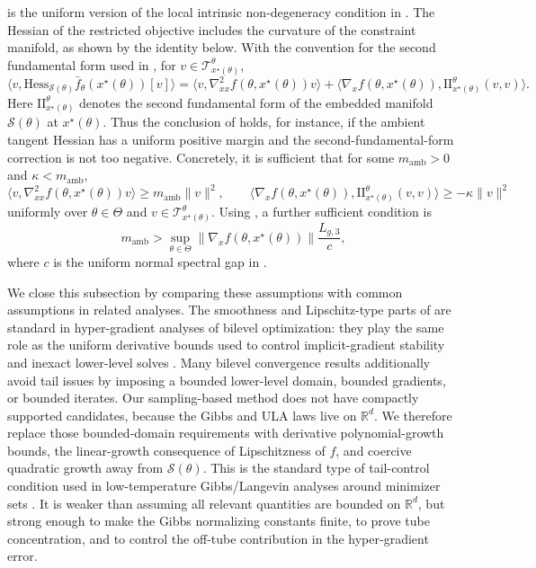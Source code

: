 \documentclass{article}
\theoremstyle{normaltheorem}
\newcommand{\R}{\mathbb{R}}
\newcommand{\calS}{\mathcal{S}}
\newcommand{\calT}{\mathcal{T}}
\begin{document}
 is the uniform version of the local intrinsic non-degeneracy condition in
. The Hessian of the restricted objective includes the curvature of the constraint
manifold, as shown by the identity below.
With the convention for the second fundamental form used in , for \(v\in\calT_{x^\star(\theta)}^\theta\),
\begin{equation}\label{eq:riem-hess-restricted}
\big\langle v,\mathrm{Hess}_{\calS(\theta)}\bar f_\theta(x^\star(\theta))[v]\big\rangle
=
\langle v,\nabla^2_{xx}f(\theta,x^\star(\theta))v\rangle
+
\langle \nabla_x f(\theta,x^\star(\theta)),
\mathrm{II}_{x^\star(\theta)}^\theta(v,v)\rangle .
\end{equation}
Here \(\mathrm{II}_{x^\star(\theta)}^\theta\) denotes the second fundamental form of the embedded manifold \(\calS(\theta)\) at \(x^\star(\theta)\).
Thus the conclusion of  holds, for instance, if the ambient tangent Hessian has a uniform
positive margin and the second-fundamental-form correction is not too negative.
Concretely, it is sufficient that for some \(m_{\mathrm{amb}}>0\) and \(\kappa<m_{\mathrm{amb}}\),
\[
\langle v,\nabla^2_{xx}f(\theta,x^\star(\theta))v\rangle
\ge m_{\mathrm{amb}}\|v\|^2,
\qquad
\langle \nabla_x f(\theta,x^\star(\theta)),
\mathrm{II}_{x^\star(\theta)}^\theta(v,v)\rangle
\ge -\kappa\|v\|^2
\]
uniformly over \(\theta\in\Theta\) and \(v\in\calT_{x^\star(\theta)}^\theta\).
Using , a further sufficient condition is
\[
m_{\mathrm{amb}}
>
\sup_{\theta\in\Theta}\|\nabla_x f(\theta,x^\star(\theta))\|\frac{L_{g,3}}{c},
\]
where \(c\) is the uniform normal spectral gap in .

We close this subsection by comparing these assumptions with common assumptions in related analyses.
The smoothness and Lipschitz-type parts of  are standard in hyper-gradient analyses of bilevel
optimization: they play the same role as the uniform derivative bounds used to control implicit-gradient stability and
inexact lower-level solves \citep{kwon2023penalty,chen2023bilevel}. Many bilevel convergence results additionally avoid
tail issues by imposing a bounded lower-level domain, bounded gradients, or bounded iterates. Our sampling-based method
does not have compactly supported candidates, because the Gibbs and ULA laws live on \(\R^d\). We therefore replace those
bounded-domain requirements with derivative polynomial-growth bounds, the linear-growth consequence of Lipschitzness of
\(f\), and coercive quadratic growth away from \(\calS(\theta)\). This is the standard type of tail-control condition
used in low-temperature Gibbs/Langevin analyses around minimizer sets
\citep{hasenpflug2024wasserstein,chewi2024analysis}. It is weaker than assuming all relevant quantities are bounded on
\(\R^d\), but strong enough to make the Gibbs normalizing constants finite, to prove tube concentration, and to control
the off-tube contribution in the hyper-gradient error.
\end{document}
